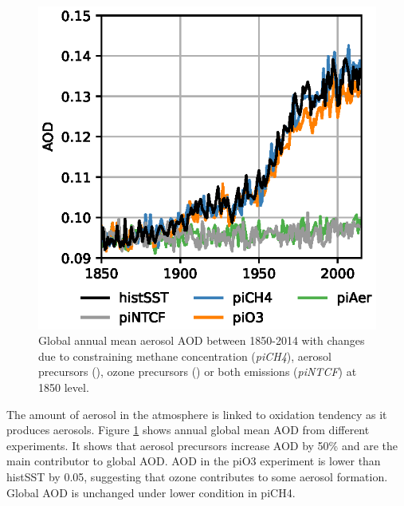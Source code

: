 \begin{figure}
    \centering
    \includegraphics{Chapter3/Figs/f05_aod-trend.eps}
    \caption[Global annual mean aerosol AOD between 1850-2014 with changes due to SLCFs]{Global annual mean aerosol AOD between 1850-2014 with changes due to constraining methane concentration (\textit{piCH4}), aerosol precursors (\sstpiaer{}), ozone precursors (\sstpio{}) or both emissions (\textit{piNTCF}) at 1850 level.}
    \label{fig:ch3:AOD}
\end{figure}


The amount of aerosol in the atmosphere is linked to  oxidation tendency as it produces  aerosols. Figure \ref{fig:ch3:AOD} shows annual global mean AOD from different experiments. It shows that aerosol precursors increase AOD by 50\% and are the main contributor to global AOD. AOD in the piO3 experiment is lower than histSST by 0.05, suggesting that ozone contributes to some aerosol formation. Global AOD is unchanged under lower  condition in piCH4.


